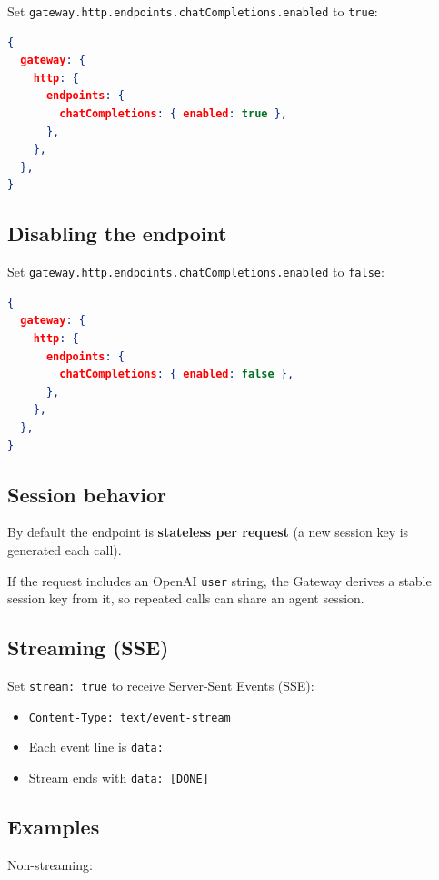 Set \texttt{gateway.http.endpoints.chatCompletions.enabled} to \texttt{true}:

\begin{lstlisting}[language=json]
{
  gateway: {
    http: {
      endpoints: {
        chatCompletions: { enabled: true },
      },
    },
  },
}
\end{lstlisting}


\subsection{Disabling the endpoint}


Set \texttt{gateway.http.endpoints.chatCompletions.enabled} to \texttt{false}:

\begin{lstlisting}[language=json]
{
  gateway: {
    http: {
      endpoints: {
        chatCompletions: { enabled: false },
      },
    },
  },
}
\end{lstlisting}


\subsection{Session behavior}


By default the endpoint is \textbf{stateless per request} (a new session key is generated each call).

If the request includes an OpenAI \texttt{user} string, the Gateway derives a stable session key from it, so repeated calls can share an agent session.

\subsection{Streaming (SSE)}


Set \texttt{stream: true} to receive Server-Sent Events (SSE):

\begin{itemize}
  \item \texttt{Content-Type: text/event-stream}
  \item Each event line is \texttt{data: }
  \item Stream ends with \texttt{data: [DONE]}
\end{itemize}


\subsection{Examples}


Non-streaming:

